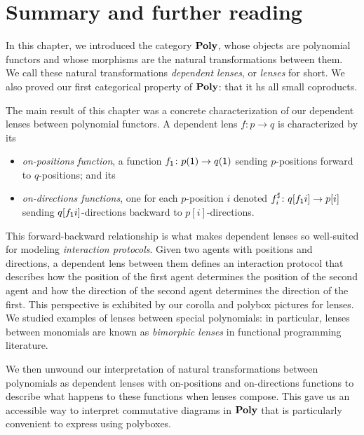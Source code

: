 \documentclass[Book-Poly]{subfiles}
\begin{document}
\section{Summary and further reading}

In this chapter, we introduced the category $\mathbf{Poly}$, whose objects are polynomial functors and whose morphisms are the natural transformations between them.
We call these natural transformations \emph{dependent lenses}, or \emph{lenses} for short.
We also proved our first categorical property of $\mathbf{Poly}$: that it hs all small coproducts.

The main result of this chapter was a concrete characterization of our dependent lenses between polynomial functors.
A dependent lens $f\colon p\to q$ is characterized by its
\begin{itemize}
  \item \emph{on-positions function}, a function $f_{\textsf{1}}\colon p(\textsf{1})\to q(\textsf{1})$ sending $p$-positions forward to $q$-positions; and its
  \item \emph{on-directions functions}, one for each $p$-position $i$ denoted $f^\sharp_i\colon q[f_{\textsf{1}} i]\to p[i]$ sending $q[f_{\textsf{1}} i]$-directions backward to $p[i]$-directions.
\end{itemize}
This forward-backward relationship is what makes dependent lenses so well-suited for modeling \emph{interaction protocols}.
Given two agents with positions and directions, a dependent lens between them defines an interaction protocol that describes how the position of the first agent determines the position of the second agent and how the direction of the second agent determines the direction of the first.
This perspective is exhibited by our corolla and polybox pictures for lenses.
We studied examples of lenses between special polynomials: in particular, lenses between monomials are known as \emph{bimorphic lenses} in functional programming literature.

We then unwound our interpretation of natural transformations between polynomials as dependent lenses with on-positions and on-directions functions to describe what happens to these functions when lenses compose.
This gave us an accessible way to interpret commutative diagrams in $\mathbf{Poly}$ that is particularly convenient to express using polyboxes.
\end{document}
